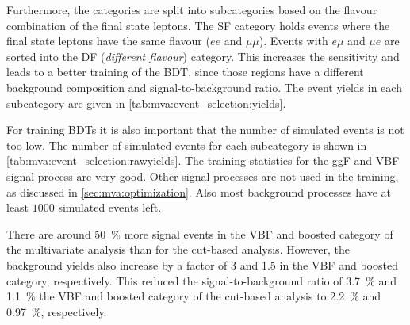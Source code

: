 
Furthermore, the categories are split into subcategories based on the flavour combination of the final state leptons.
The SF category holds events where the final state leptons have the same flavour ($ee$ and $\mu\mu$).
Events with $e\mu$ and $\mu e$ are sorted into the DF (\emph{different flavour}) category.
This increases the sensitivity and leads to a better training of the BDT, since those regions have a different background composition and signal-to-background ratio.
The event yields in each subcategory are given in \cref{tab:mva:event_selection:yields}.

For training BDTs it is also important that the number of simulated events is not too low.
The number of simulated events for each subcategory is shown in \cref{tab:mva:event_selection:rawyields}.
The training statistics for the ggF and VBF signal process are very good.
Other signal processes are not used in the training, as discussed in \cref{sec:mva:optimization}.
Also most background processes have at least $1000$ simulated events left.

There are around \SI{50}{\percent} more signal events in the VBF and boosted category of the multivariate analysis than
for the cut-based analysis.
However, the background yields also increase by a factor of 3 and 1.5 in the VBF and boosted category, respectively.
This reduced the signal-to-background ratio of \SI{3.7}{\percent} and \SI{1.1}{\percent} the VBF and boosted category
of the cut-based analysis to \SI{2.2}{\percent} and \SI{0.97}{\percent}, respectively.


